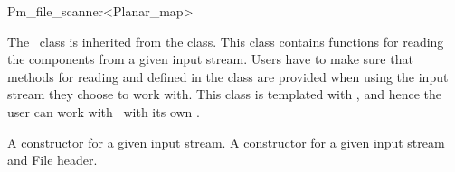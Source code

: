 
\ccRefPageBegin

\renewcommand{\ccRefPageBegin}{\begin{ccAdvanced}}
\renewcommand{\ccRefPageEnd}{\end{ccAdvanced}}

\begin{ccRefClass}{Pm_file_scanner<Planar_map>}


\ccDefinition
The \ccRefName\ class is inherited from the  class. 
This class contains functions for reading the  components from a given input stream. 
Users have to make sure that methods for reading  and  defined in  
the  class are provided when using the input stream they choose to work with.
This class is templated with , and hence the user can work with \ccRefName\ with its own . 
 

\ccTypes


\ccGlue
{}
\ccGlue
{}
\ccGlue
{}
\ccGlue
{}
\ccGlue
{}

\ccCreation
    
{A constructor for a given input stream.}
{A constructor for a given input stream and File header.}


\end{ccRefClass}
